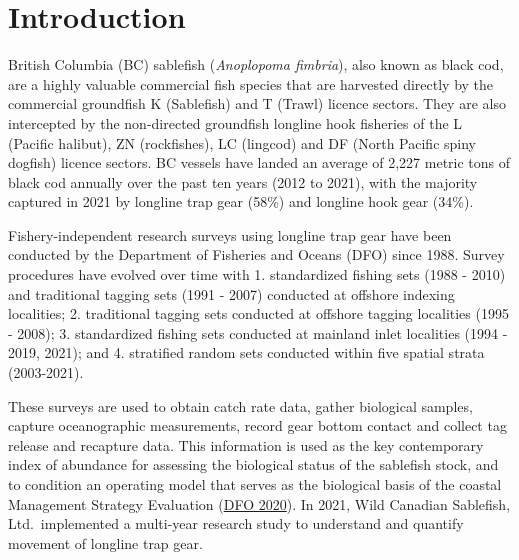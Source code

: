 \documentclass[12pt]{article}\usepackage[]{graphicx}\usepackage[]{color}
\begin{document}

\frontmatter


\renewcommand{\headrulewidth}{0.5pt}  %
\renewcommand{\footrulewidth}{0.5pt}  %

\newcommand{\lt}{\ensuremath <}
\newcommand{\gt}{\ensuremath >}

\newlength{\cslhangindent}
\setlength{\cslhangindent}{1.5em}
\newenvironment{cslreferences}%
  {}%
  {\par}

\hypertarget{sec:introduction}{%
\section{Introduction}\label{sec:introduction}}

British Columbia (BC) sablefish (\emph{Anoplopoma fimbria}), also known as black cod, are a highly valuable commercial fish species that are harvested directly by the commercial groundfish K (Sablefish) and T (Trawl) licence sectors. They are also intercepted by the non-directed groundfish longline hook fisheries of the L (Pacific halibut), ZN (rockfishes), LC (lingcod) and DF (North Pacific spiny dogfish) licence sectors. BC vessels have landed an average of 2,227 metric tons of black cod annually over the past ten years (2012 to 2021), with the majority captured in 2021 by longline trap gear (58\%) and longline hook gear (34\%).

Fishery-independent research surveys using longline trap gear have been conducted by the Department of Fisheries and Oceans (DFO) since 1988. Survey procedures have evolved over time with 1. standardized fishing sets (1988 - 2010) and traditional tagging sets (1991 - 2007) conducted at offshore indexing localities; 2. traditional tagging sets conducted at offshore tagging localities (1995 - 2008); 3. standardized fishing sets conducted at mainland inlet localities (1994 - 2019, 2021); and 4. stratified random sets conducted within five spatial strata (2003-2021).

These surveys are used to obtain catch rate data, gather biological samples, capture oceanographic measurements, record gear bottom contact and collect tag release and recapture data. This information is used as the key contemporary index of abundance for assessing the biological status of the sablefish stock, and to condition an operating model that serves as the biological basis of the coastal Management Strategy Evaluation (\protect\hyperlink{ref-DFO2020}{DFO 2020}). In 2021, Wild Canadian Sablefish, Ltd.~implemented a multi-year research study to understand and quantify movement of longline trap gear.
\end{document}
